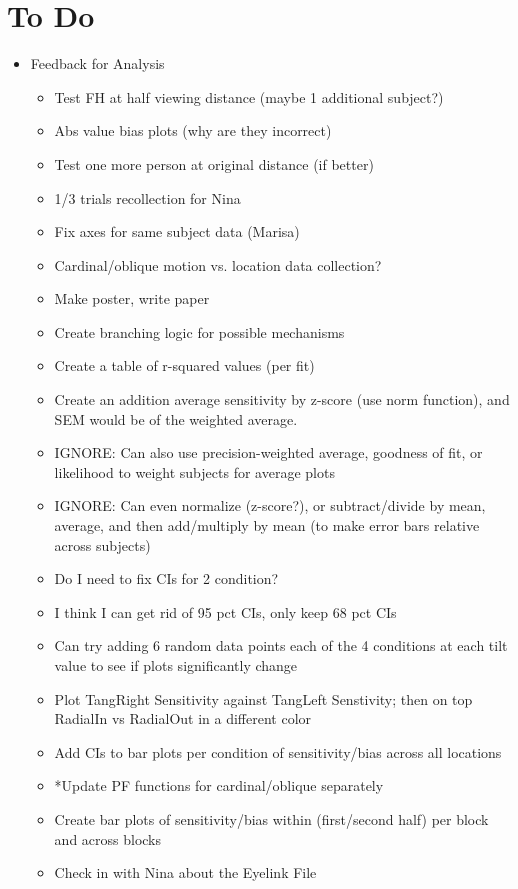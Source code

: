 \documentclass[11pt]{article} %
\begin{document}
\section{To Do} 
\begin{itemize}
\item Feedback for Analysis
	\begin{itemize}
	\item Test FH at half viewing distance (maybe 1 additional subject?)
	\item Abs value bias plots (why are they incorrect)
	\item Test one more person at original distance (if better)
	\item 1/3 trials recollection for Nina
	\item Fix axes for same subject data (Marisa)
	\item Cardinal/oblique motion vs. location data collection?
	\item Make poster, write paper
	\item Create branching logic for possible mechanisms
	\item Create a table of r-squared values (per fit)
	\item Create an addition average sensitivity by z-score (use norm function), and SEM would be of the weighted average.
	\item IGNORE: Can also use precision-weighted average, goodness of fit, or likelihood to weight subjects for average plots
	\item IGNORE: Can even normalize (z-score?), or subtract/divide by mean, average, and then add/multiply by mean (to make error bars relative across subjects)
	\item Do I need to fix CIs for 2 condition?
	\item I think I can get rid of 95 pct CIs, only keep 68 pct CIs
	\item Can try adding 6 random data points each of the 4 conditions at each tilt value to see if plots significantly change
	\item Plot TangRight Sensitivity against TangLeft Senstivity; then on top RadialIn vs RadialOut in a different color
	\item Add CIs to bar plots per condition of sensitivity/bias across all locations
	\item *Update PF functions for cardinal/oblique separately
	\item Create bar plots of sensitivity/bias within (first/second half) per block and across blocks
	\item Check in with Nina about the Eyelink File

\end{itemize}
\end{itemize}
\end{document}
